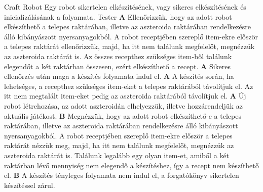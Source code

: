 \documentclass[../../projlab]{subfiles}
\begin{document}
\begin{use-case}
    {Craft Robot}
    {Egy robot sikertelen elkészítésének, vagy sikeres elkészítésének és inicializálásának a folyamata. }
    {Tester} 
    \textbf{A} Ellenőrizzük, hogy az adott robot elkészíthető a telepes raktárában, illetve az aszteroida raktárában rendelkezésre álló kibányászott nyersanyagokból. A robot receptjében szereplő item-ekre először a telepes raktárát ellenőrizzük, majd, ha itt nem találunk megfelelőt, megnézzük az aszteroida raktárát is. Az összes recepthez szükséges item-ből találunk elegendőt a két raktárban összesen, ezért elkészíthető a recept.  \newline
    \textbf{A} Sikeres ellenőrzés után maga a készítés folyamata indul el.  \newline
    \textbf{A} A készítés során, ha lehetséges, a recepthez szükséges item-eket a telepes raktárából távolítjuk el. Az itt nem megtalált item-eket pedig az aszteroida raktárából távolítjuk el.  \newline
    \textbf{A} Új robot létrehozása, az adott aszteroidán elhelyezzük, illetve hozzárendeljük az aktuális játékost.  \newline
    \textbf{B} Megnézzük, hogy az adott robot elkészíthető-e a telepes raktárában, illetve az aszteroida raktárában rendelkezésre álló kibányászott nyersanyagokból. A robot receptjében szereplő item-ekre először a telepes raktárát nézzük meg, majd, ha itt nem találunk megfelelőt, megnézzük az aszteroida raktárát is. Találunk legalább egy olyan item-et, amiből a két raktárban lévő mennyiség nem elegendő a készítéshez, így a recept nem készíthető el.  \newline
    \textbf{B} A készítés tényleges folyamata nem indul el, a forgatókönyv sikertelen készítéssel zárul. \newline
\end{use-case}
\end{document}
